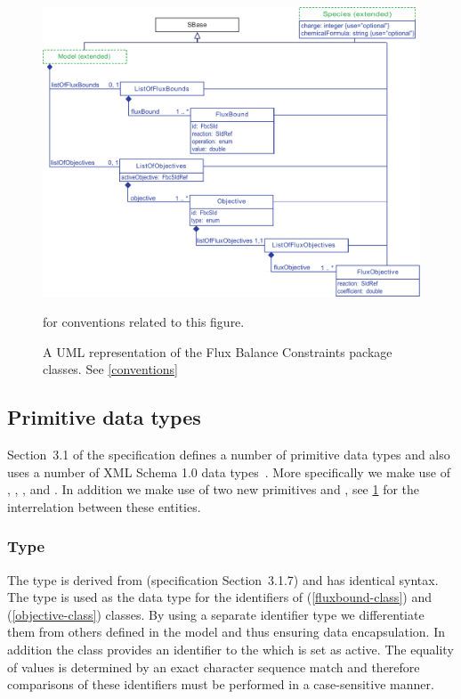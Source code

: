 \begin{figure}[h]
  \centering
  \includegraphics[width=\textwidth]{images/fbc_uml.pdf}\\
  \caption{A UML representation of the Flux Balance Constraints package classes. See \ref{conventions}} for conventions related to this figure. \label{fig:fbc_uml}
\end{figure}

\subsection{Primitive data types}
\label{primtypes}
Section~3.1 of the \sbmlthreecore specification defines a number of
primitive data types and also uses a number of XML Schema 1.0 data
types~\citep{biron:2000}.  More specifically we make use of , , ,  and . In addition we make use of two new primitives  and , see \ref{fig:fbc_uml} for the interrelation between these entities.

\subsubsection{Type }
\label{primtype-fbcsid}

The type  is derived from  (\sbmlthreecore specification Section~3.1.7) and has identical syntax. The  type is used as the data type for the identifiers of \FluxBound (\ref{fluxbound-class}) and \Objective (\ref{objective-class}) classes. By using a separate identifier type we differentiate them from others defined in the \SBML model and thus ensuring data encapsulation. In addition the \Objective class  provides an identifier to the \Objective which is set as active. The equality of  values is determined by an exact character sequence match and therefore comparisons of these identifiers must be performed in a case-sensitive manner.

